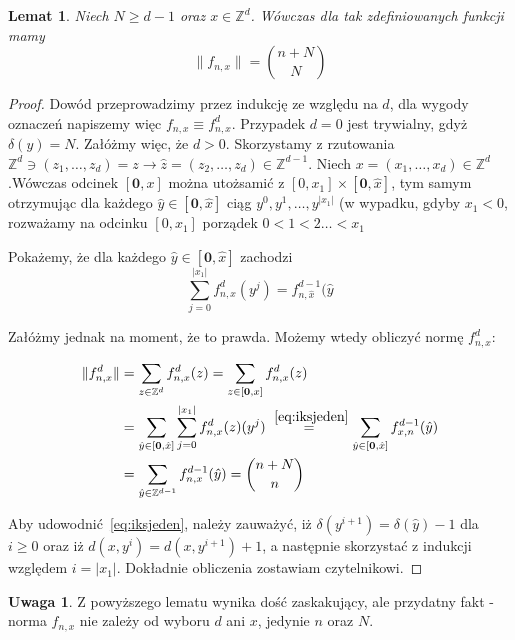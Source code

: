 \documentclass[licencjacka]{pracamgr}
\theoremstyle{definition}
\theoremstyle{definition}
\newtheorem{remark}{Uwaga}[section]
\theoremstyle{definition}
\theoremstyle{definition}
\theoremstyle{definition}
\theoremstyle{plain}
\newtheorem{lemma}{Lemat}[section]
\theoremstyle{plain}
\begin{document}
\begin{lemma}
	Niech $ N \geq d - 1 $ oraz $ x \in \mathbb{Z}^d $. Wówczas dla tak zdefiniowanych funkcji 
	mamy $$ \| f_{n,x}\|  = { n + N \choose N}$$
\end{lemma}
\begin{proof}
	Dowód przeprowadzimy przez indukcję ze względu na $ d $, dla wygody oznaczeń napiszemy 
	więc $ f_{n,x} \equiv f_{n,x}^d $. Przypadek $ d = 0 $ jest trywialny, gdyż 
	$ \delta(y) = N $. Załóżmy więc, że $ d > 0 $. Skorzystamy z rzutowania 
	$ \mathbb{Z}^d \ni (z_1, \dots, z_d) = z \rightarrow \hat z = (z_2, \dots, z_d) \in 
	\mathbb{Z}^{d-1} $.
	Niech $ x = (x_1, \dots, x_d) \in \mathbb{Z}^d $.Wówczas odcinek 
	$ [\textbf{0}, x]$ można utożsamić z $[0,x_1] \times [\textbf{0}, \hat x] $, tym 
	samym otrzymując dla każdego $ \hat y \in [\textbf{0}, \hat x] $ ciąg 
	$ y^0, y^1, \dots, y^{|x_1|} $ (w wypadku, gdyby $ x_1 < 0 $, rozważamy na odcinku 
	$ [0,x_1] $ porządek $ 0 < 1 < 2 \dots <x_1 $

	Pokażemy, że dla każdego $ \hat y \in [\textbf{0}, \hat x] $ zachodzi 
	\begin{equation} \label{eq:iksjeden}
	\sum\limits_{j = 0}^{|x_1|} f_{n,x}^d(y^j) = f^{d-1}_{n,\hat x}(\hat y
	\end{equation}

	Załóżmy jednak na moment, że to prawda. Możemy wtedy obliczyć normę $ f_{n,x}^d $:

	\begin{align*}
		\| f^d_{n,x} \| & = \sum\limits_{z \in \mathbb{Z}^d}f^d_{n,x}(z) = 
		\sum\limits_{z \in [\textbf{0}, x]} f^d_{n,x} (z) \\
		& = \sum\limits_{\hat y \in [\textbf{0}, \hat x]} \sum\limits_{j = 0}^{|x_1|}
		f_{n,x}^d(z) (y^j) \stackrel{~\ref{eq:iksjeden}}{=} \sum\limits_{\hat y 
		\in [\textbf{0}, \hat x]} f^{d-1}_{x,n} (\hat y) \\
		& = \sum\limits_{\hat y \in \mathbb{Z}^{d-1}} f_{n,x}^{d-1} (\hat y) = 
		{n + N \choose n} 
	\end{align*}

	Aby udowodnić~\ref{eq:iksjeden}, należy zauważyć, iż 
	$ \delta (y^{i+1}) = \delta(\hat y) - 1 $ dla $ i \geq 0 $ oraz iż $ d(x,y^i) = 
	d(x, y^{i+1}) + 1 $, a następnie skorzystać z indukcji względem $ i = |x_1|$. 
	Dokładnie obliczenia zostawiam czytelnikowi.
\end{proof}

\begin{remark}
	Z powyższego lematu wynika dość zaskakujący, ale przydatny fakt - norma 
	$ f_{n,x} $ nie zależy od wyboru $ d $ ani $ x $, jedynie $ n $ oraz $ N $.
\end{remark}
\end{document}
